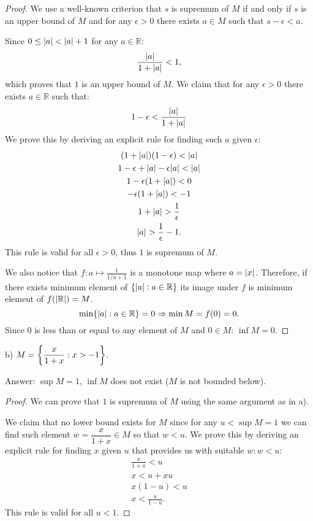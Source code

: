 \documentclass{article}
\newcommand{\R}{\mathbb{R}}
\DeclarePairedDelimiter{\abs}{\lvert}{\rvert}
\DeclarePairedDelimiter{\set}{ \{ }{ \} }
\begin{document}
\begin{proof}
We use a well-known criterion that $s$ is supremum of $M$ if and only if $s$ is an upper bound of $M$ and for any $\epsilon > 0$ there exists $a \in M$ such that $s - \epsilon < a$.

Since $0 \leq \abs{a} < \abs{a} + 1$ for any $a\in \R$:
\[ \frac{\abs{a}}{1+\abs{a}} < 1, \]
which proves that $1$ is an upper bound of $M$.
We claim that for any $\epsilon > 0$ there exists $a \in \R$ such that:
\[ 1 - \epsilon < \frac{\abs{a}}{1+\abs{a}} \]
We prove this by deriving an explicit rule for finding such $a$ given $\epsilon$:
\begin{gather*}
    (1 + \abs{a})(1-\epsilon) < \abs{a} \\
    1 - \epsilon + \abs{a} - \epsilon \abs{a} < \abs{a} \\
    1 - \epsilon(1 + \abs{a}) < 0 \\
    - \epsilon(1 + \abs{a}) < -1 \\
    1 + \abs{a} > \frac{1}{\epsilon} \\
    \abs{a} > \frac{1}{\epsilon}-1.    
\end{gather*}
This rule is valid for all $\epsilon > 0$, thus $1$ is supremum of $M$.

We also notice that $f: a \mapsto \frac{1}{1/a+1}$ is a monotone map where $a = \abs{x}$.
Therefore, if there exists minimum element of $\set{ \abs{a} : a \in \R }$ its image under $f$ is minimum element of $f(\abs{\R}) = M$.
\[ \min \set{ \abs{a} : a \in \R } = 0 \Rightarrow \min M = f(0) = 0. \]
Since $0$ is less than or equal to any element of $M$ and $0 \in M$: $\inf M = 0$.

\end{proof}

\begin{tcolorbox}
b) $M = \set*{ \dfrac{x}{1+x} : x > -1 }$.
\end{tcolorbox}

Answer: $\sup M = 1$, $\inf M$ does not exist ($M$ is not bounded below).

\begin{proof}

We can prove that $1$ is supremum of $M$ using the same argument as in a).

We claim that no lower bound exists for $M$ since for any $u < \sup M = 1$ we can find such element $w = \dfrac{x}{1+x} \in M$ so that $w<u$.
We prove this by deriving an explicit rule for finding $x$ given $u$ that provides us with suitable $w: w < u$:
\begin{gather*}
    \frac{x}{1+x} < u \\
    x < u + xu \\
    x(1-u)<u \\
    x < \frac{u}{1-u}.    
\end{gather*}
This rule is valid for all $u < 1$.
\end{proof}
\end{document}
